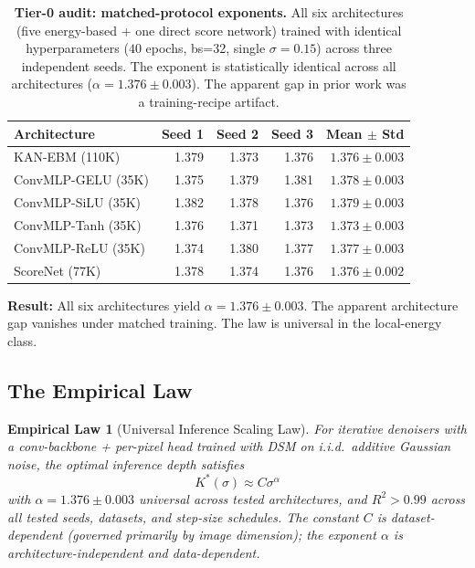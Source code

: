 \documentclass[letterpaper]{article}
\newtheorem{empirical}{Empirical Law}
\begin{document}
\begin{table}[h]
\centering\small
\begin{tabular}{lrrrr}
\toprule
Architecture & Seed 1 & Seed 2 & Seed 3 & Mean $\pm$ Std \\
\midrule
KAN-EBM (110K)      & 1.379 & 1.373 & 1.376 & $1.376 \pm 0.003$ \\
ConvMLP-GELU (35K)  & 1.375 & 1.379 & 1.381 & $1.378 \pm 0.003$ \\
ConvMLP-SiLU (35K)  & 1.382 & 1.378 & 1.376 & $1.379 \pm 0.003$ \\
ConvMLP-Tanh (35K)  & 1.376 & 1.371 & 1.373 & $1.373 \pm 0.003$ \\
ConvMLP-ReLU (35K)  & 1.374 & 1.380 & 1.377 & $1.377 \pm 0.003$ \\
\midrule
ScoreNet (77K)      & 1.378 & 1.374 & 1.376 & $1.376 \pm 0.002$ \\
\bottomrule
\end{tabular}
\caption{\textbf{Tier-0 audit: matched-protocol exponents.} All six architectures (five energy-based + one direct score network) trained with identical hyperparameters ($40$ epochs, bs=32, single $\sigma{=}0.15$) across three independent seeds. The exponent is statistically identical across all architectures ($\alpha = 1.376 \pm 0.003$). The apparent gap in prior work was a training-recipe artifact.}
\label{tab:tier0}
\end{table}

\textbf{Result:} All six architectures yield $\alpha = 1.376 \pm 0.003$. The apparent architecture gap vanishes under matched training. The law is universal in the local-energy class.

\subsection{The Empirical Law}
\label{sec:empirical}

\begin{empirical}[Universal Inference Scaling Law]\label{prop:law}
For iterative denoisers with a conv-backbone + per-pixel head trained with DSM on i.i.d.~additive Gaussian noise, the optimal inference depth satisfies
\begin{equation}
K^*(\sigma) \approx C\sigma^{\alpha}
\end{equation}
with $\alpha = 1.376 \pm 0.003$ universal across tested architectures, and $R^2 > 0.99$ across all tested seeds, datasets, and step-size schedules. The constant $C$ is dataset-dependent (governed primarily by image dimension); the exponent $\alpha$ is architecture-independent and data-dependent.
\end{empirical}
\end{document}

